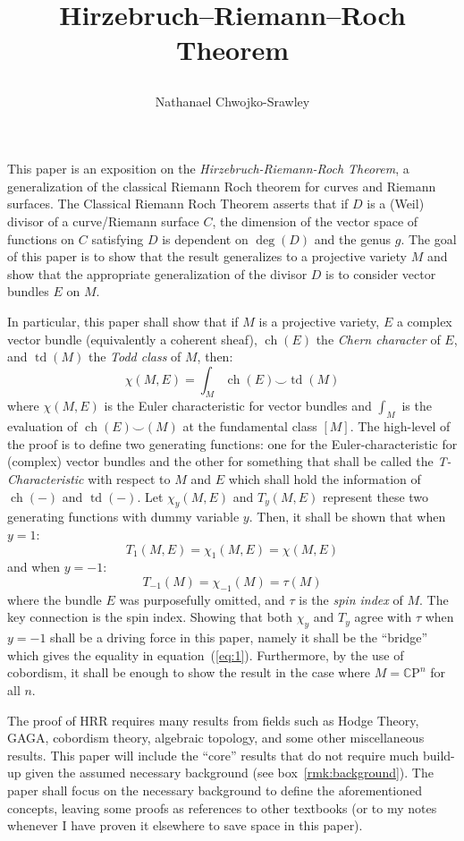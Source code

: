 \documentclass{book}
\title{
	\begin{huge}
		\bf{Hirzebruch–Riemann–Roch Theorem}
	\end{huge}
	}
\author{Nathanael Chwojko-Srawley}
\newcommand{\CP}{{\mathbb{C}\mathrm{P}}}
\newcommand{\ch}{{\operatorname{ch}}}
\renewcommand{\deg}{{\operatorname{deg}}}
\newcommand{\td}{{\operatorname{td}}}
\renewcommand{\ch}{{\operatorname{ch}}}
\begin{document}
\maketitle
\tableofcontents

\newpage

This paper is an exposition on the \emph{Hirzebruch-Riemann-Roch Theorem}, a generalization of the classical
Riemann Roch theorem for curves and Riemann surfaces. The Classical Riemann Roch Theorem asserts that if $D$
is a (Weil) divisor of a curve/Riemann surface $C$, the dimension of the vector space of functions on $C$
satisfying $D$ is dependent on $\deg(D)$ and the genus $g$. The goal of this paper is to
show that the result generalizes to a projective variety $M$ and show that the appropriate generalization of the
divisor $D$ is to consider vector bundles $E$ on $M$.

In particular, this paper shall show that if $M$ is a projective variety, $E$ a complex vector bundle (equivalently a
coherent sheaf), $\ch(E)$ the \emph{Chern character} of $E$, and $\td(M)$ the \emph{Todd class} of $M$, then:
\begin{equation}\label{eq:1}
  \chi(M, E) = \int_M \ch(E)\smile \td(M)
\end{equation}
where $\chi(M, E)$ is the Euler characteristic for vector bundles and $\int_M$ is the evaluation of
$\ch(E)\smile (M)$ at the fundamental class $[M]$. The high-level of the proof is to define two generating
functions: one for the Euler-characteristic for (complex) vector bundles and the other for
something that shall be called the \emph{T-Characteristic} with respect to $M$ and $E$ which shall hold the
information of $\ch(-)$ and $\td(-)$. Let $\chi_y(M,E)$ and $T_y(M,E)$ represent these two generating
functions with dummy variable $y$. Then, it shall be shown that when $y=1$:
\[
  T_1(M,E) = \chi_1(M,E) = \chi(M,E)
\]
and when $y = -1$:
\[
  T_{-1}(M) = \chi_{-1}(M) = \tau(M)
\]
where the bundle $E$ was purposefully omitted, and $\tau$ is the \emph{spin index} of $M$. The key connection
is the spin index. Showing that both $\chi_y$ and $T_y$ agree with $\tau$ when $y=-1$ shall be a driving
force in this paper, namely it shall be the ``bridge'' which gives the equality in equation~(\ref{eq:1}). Furthermore, by
the use of cobordism, it shall be enough to show the result in the case where $M = \CP^n$ for all $n$.



The proof of HRR requires many results from fields such as Hodge Theory, GAGA, cobordism theory, algebraic
topology, and some other miscellaneous results. This paper will include the ``core'' results that do not require much
build-up given the assumed necessary background (see box~\ref{rmk:background}). The paper shall focus on the
necessary background to define the aforementioned concepts, leaving some proofs as references to other
textbooks (or to my notes whenever I have proven it elsewhere to save space in this paper).
\end{document}
